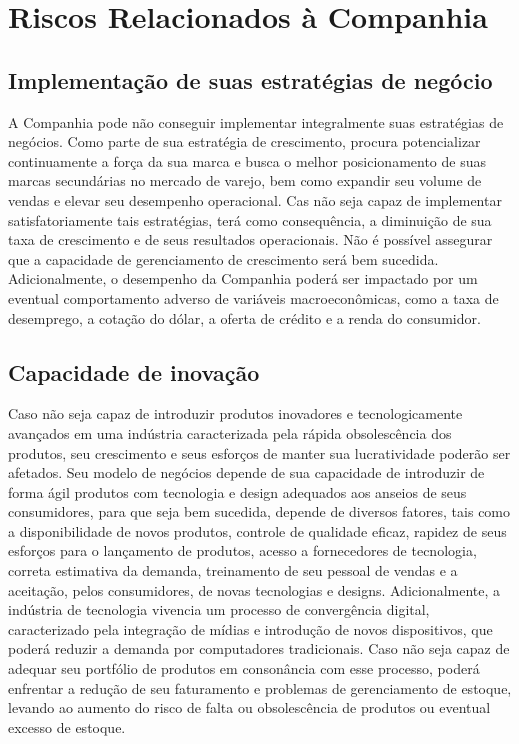 {\section{Riscos Relacionados à Companhia}

\subsection{Implementação de suas estratégias de negócio}
A Companhia pode não conseguir implementar integralmente suas estratégias de negócios. Como parte de sua estratégia de crescimento, procura potencializar continuamente a força da sua marca e busca o melhor posicionamento de suas marcas secundárias no mercado de varejo, bem como expandir seu volume de vendas e elevar seu desempenho operacional. Cas não seja capaz de implementar satisfatoriamente tais estratégias, terá como consequência, a diminuição de sua taxa de crescimento e de seus resultados operacionais. Não é possível assegurar que a capacidade de gerenciamento de crescimento será bem sucedida. Adicionalmente, o desempenho da Companhia poderá ser impactado por um eventual comportamento adverso de variáveis macroeconômicas, como a taxa de desemprego, a cotação do dólar, a oferta de crédito e a renda do consumidor.

\subsection{Capacidade de inovação}
Caso não seja capaz de introduzir produtos inovadores e tecnologicamente avançados em uma indústria caracterizada pela rápida obsolescência dos produtos, seu crescimento e seus esforços de manter sua lucratividade poderão ser afetados. Seu modelo de negócios depende de sua capacidade de introduzir de forma ágil produtos com tecnologia e design adequados aos anseios de seus consumidores, para que seja bem sucedida, depende de diversos fatores, tais como a disponibilidade de novos produtos, controle de qualidade eficaz, rapidez de seus esforços para o lançamento de produtos, acesso a fornecedores de tecnologia, correta estimativa da demanda, treinamento de seu pessoal de vendas e a aceitação, pelos consumidores, de novas tecnologias e designs. 
Adicionalmente, a indústria de tecnologia vivencia um processo de convergência digital, caracterizado pela integração de mídias e introdução de novos dispositivos, que poderá reduzir a demanda por computadores tradicionais. Caso não seja capaz de adequar seu portfólio de produtos em consonância com esse processo, poderá enfrentar a redução de seu faturamento e problemas de gerenciamento de estoque, levando ao aumento do risco de falta ou obsolescência de produtos ou eventual excesso de estoque.

}
